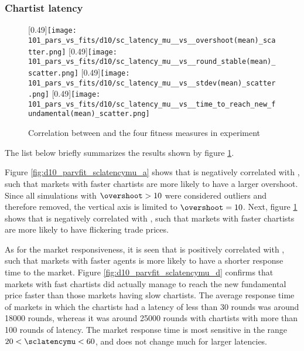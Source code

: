 \subsubsection*{Chartist latency}
\begin{figure}
	\centering
	[0.49\linewidth]{\texttt{[image: 101\_pars\_vs\_fits/d10/sc\_latency\_mu\_\_vs\_\_overshoot(mean)\_scatter.png]}}
	[0.49\linewidth]{\texttt{[image: 101\_pars\_vs\_fits/d10/sc\_latency\_mu\_\_vs\_\_round\_stable(mean)\_scatter.png]}}
	[0.49\linewidth]{\texttt{[image: 101\_pars\_vs\_fits/d10/sc\_latency\_mu\_\_vs\_\_stdev(mean)\_scatter.png]}}
	[0.49\linewidth]{\texttt{[image: 101\_pars\_vs\_fits/d10/sc\_latency\_mu\_\_vs\_\_time\_to\_reach\_new\_fundamental(mean)\_scatter.png]}}
	\caption{Correlation between \sclatencymu and the four fitness measures in experiment \dten}
	\label{fig:d10_parvfit_sclatencymu}
\end{figure}
The list below briefly summarizes the results shown by figure \ref{fig:d10_parvfit_sclatencymu}.

Figure \ref{fig:d10_parvfit_sclatencymu_a} shows that \sclatencymu is negatively correlated with \overshoot, such that markets with faster chartists are more likely to have a larger overshoot. Since all simulations with $\overshoot>10$ were considered outliers and therefore removed, the vertical axis is limited to $\overshoot = 10$. Next, figure \ref{fig:d10_parvfit_sclatencymu}  shows that \sclatencymu is negatively correlated with \stdev, such that markets with faster chartists are more likely to have flickering trade prices. 

As for the market responsiveness, it is seen that \sclatencymu is positively correlated with \timetoreachnewfundamental, such that markets with faster agents is more likely to have a shorter response time to the market. Figure \ref{fig:d10_parvfit_sclatencymu_d} confirms that markets with fast chartists did actually manage to reach the new fundamental price faster than those markets having slow chartists. The average response time of markets in which the chartists had a latency of less than 30 rounds was around 18000 rounds, whereas it was around 25000 rounds with chartists with more than 100 rounds of latency. The market response time is most sensitive in the range $20< \sclatencymu<60$, and does not change much for larger latencies. 

